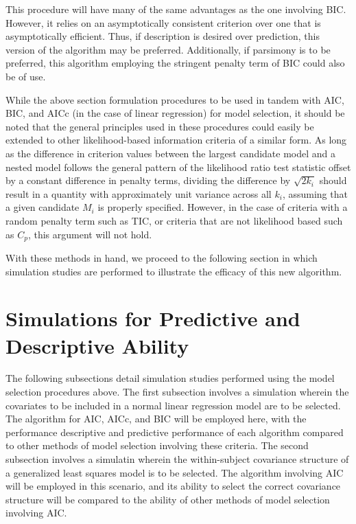 		This procedure will have many of the same advantages as the one involving BIC. However, it relies on an asymptotically consistent criterion over one that
		is asymptotically efficient. Thus, if description is desired over prediction, this version of the algorithm may be preferred. Additionally, if parsimony
		is to be preferred, this algorithm employing the stringent penalty term of BIC could also be of use.

		While the above section formulation procedures to be used in tandem with AIC, BIC, and AICc (in the case of linear regression) for model selection, it should be
		noted that the general principles used in these procedures could easily be extended to other likelihood-based information criteria of a similar form. As long
		as the difference in criterion values between the largest candidate model and a nested model follows the general pattern of the likelihood ratio test statistic
		offset by a constant difference in penalty terms, dividing the difference by $\sqrt{2k_i}$ should result in a quantity with approximately unit variance across
		all $k_i$, assuming that a given candidate $M_i$ is properly specified. However, in the case of criteria with a random penalty term such as TIC, or criteria that
		are not likelihood based such as $C_p$, this argument will not hold.
		
		With these methods in hand, we proceed to the following section in which simulation studies are performed to illustrate the efficacy of this new algorithm.

		\section{Simulations for Predictive and Descriptive Ability} \label{sec:sim_model_select}

		The following subsections detail simulation studies performed using the model selection procedures above. The first subsection involves a simulation wherein
		the covariates to be included in a normal linear regression model are to be selected. The algorithm for AIC, AICc, and BIC will be employed here, with the
		performance descriptive and predictive performance of each algorithm compared to other methods of model selection involving these criteria. The second subsection
		involves a simulatin wherein the within-subject covariance structure of a generalized least squares model is to be selected. The algorithm involving AIC will be
		employed in this scenario, and its ability to select the correct covariance structure will be compared to the ability of other methods of model selection involving
		AIC.

